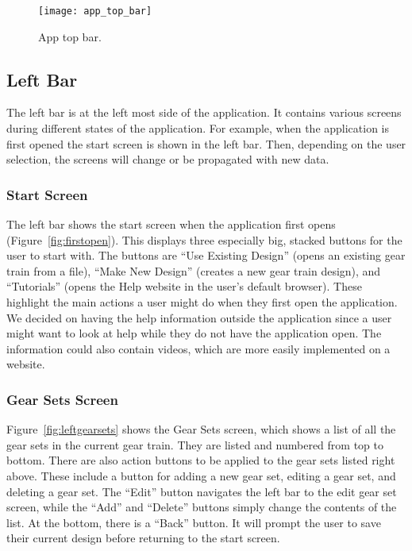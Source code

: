 \begin{doublespace}
\begin{figure}[htbp]
    \centering
    \texttt{[image: app\_top\_bar]}
    \caption{App top bar.}
    \label{fig:topbar}
\end{figure}

\subsection{Left Bar}

The left bar is at the left most side of the application. It contains various screens during different states of the application. For example, when the application is first opened the start screen is shown in the left bar. Then, depending on the user selection, the screens will change or be propagated with new data.

\subsubsection{Start Screen}

The left bar shows the start screen when the application first opens (Figure~\ref{fig:firstopen}). This displays three especially big, stacked buttons for the user to start with. The buttons are ``Use Existing Design'' (opens an existing gear train from a file), ``Make New Design'' (creates a new gear train design), and ``Tutorials'' (opens the Help website in the user's default browser). These highlight the main actions a user might do when they first open the application. We decided on having the help information outside the application since a user might want to look at help while they do not have the application open. The information could also contain videos, which are more easily implemented on a website. 

\subsubsection{Gear Sets Screen}

Figure~\ref{fig:leftgearsets} shows the Gear Sets screen, which shows a list of all the gear sets in the current gear train. They are listed and numbered from top to bottom. There are also action buttons to be applied to the gear sets listed right above. These include a button for adding a new gear set, editing a gear set, and deleting a gear set. The ``Edit'' button navigates the left bar to the edit gear set screen, while the ``Add'' and ``Delete'' buttons simply change the contents of the list. At the bottom, there is a ``Back'' button. It will prompt the user to save their current design before returning to the start screen.


\end{doublespace}
